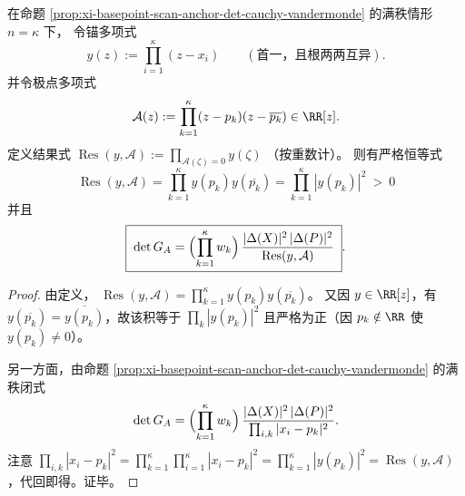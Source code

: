 \begin{corollary}\label{cor:xi-basepoint-scan-anchor-det-resultant}
在命题 \ref{prop:xi-basepoint-scan-anchor-det-cauchy-vandermonde} 的满秩情形 \(n=\kappa\) 下，
令锚多项式
\[
y(z):=\prod_{i=1}^{\kappa}(z-x_i)
\qquad(\text{首一，且根两两互异}).
\]
并令极点多项式
\[
\mathcal{A}(z):=\prod_{k=1}^{\kappa}(z-p_k)(z-\overline{p_k})\in\RR[z].
\]
定义结果式
\(
\operatorname{Res}(y,\mathcal{A}):=\prod_{\mathcal{A}(\zeta)=0}y(\zeta)
\)
（按重数计）。
则有严格恒等式
\[
\boxed{\;
\operatorname{Res}(y,\mathcal{A})
=\prod_{k=1}^{\kappa}y(p_k)y(\overline{p_k})
=\prod_{k=1}^{\kappa}|y(p_k)|^{2}\ >\ 0\;}
\]
并且
\[
\boxed{\;
\det G_A
=\Bigl(\prod_{k=1}^{\kappa}w_k\Bigr)\,
\frac{|\Delta(X)|^2\,|\Delta(P)|^2}{\operatorname{Res}(y,\mathcal{A})}\; }.
\]
\end{corollary}
\begin{proof}
由定义，
\(
\operatorname{Res}(y,\mathcal{A})
=\prod_{k=1}^{\kappa}y(p_k)y(\overline{p_k})
\)。
又因 \(y\in\RR[z]\)，有 \(y(\overline{p_k})=\overline{y(p_k)}\)，故该积等于 \(\prod_k|y(p_k)|^2\) 且严格为正（因 \(p_k\notin\RR\) 使 \(y(p_k)\ne 0\)）。
\par
另一方面，由命题 \ref{prop:xi-basepoint-scan-anchor-det-cauchy-vandermonde} 的满秩闭式
\[
\det G_A=\Bigl(\prod_{k=1}^{\kappa}w_k\Bigr)\,
\frac{|\Delta(X)|^2\,|\Delta(P)|^2}{\prod_{i,k}|x_i-p_k|^2}.
\]
注意
\(
\prod_{i,k}|x_i-p_k|^2
=\prod_{k=1}^{\kappa}\prod_{i=1}^{\kappa}|x_i-p_k|^2
=\prod_{k=1}^{\kappa}|y(p_k)|^2
=\operatorname{Res}(y,\mathcal{A})
\)，代回即得。证毕。
\end{proof}

